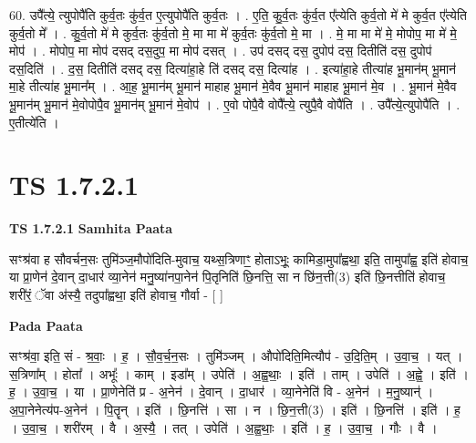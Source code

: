 \documentclass[17pt]{extarticle}
\begin{document}
60. उपै᳚त्ये॒ त्युपोपै॑ति कुर्व॒तः कु॑र्व॒त ए॒त्युपोपै॑ति कुर्व॒तः । . ए॒ति॒ कु॒र्व॒तः कु॑र्व॒त ए᳚त्येति कुर्व॒तो मे॑ मे कुर्व॒त ए᳚त्येति कुर्व॒तो मे᳚ । . कु॒र्व॒तो मे॑ मे कुर्व॒तः कु॑र्व॒तो मे॒ मा मा मे॑ कुर्व॒तः कु॑र्व॒तो मे॒ मा । . मे॒ मा मा मे॑ मे॒ मोपोप॒ मा मे॑ मे॒ मोप॑ । . मोपोप॒ मा मोप॑ दसद् दस॒दुप॒ मा मोप॑ दसत् । . उप॑ दसद् दस॒ दुपोप॑ दस॒ दितीति॑ दस॒ दुपोप॑ दस॒दिति॑ । . द॒स॒ दितीति॑ दसद् दस॒ दित्या॑हा॒हे ति॑ दसद् दस॒ दित्या॑ह । . इत्या॑हा॒हे तीत्या॑ह भू॒मान॑म् भू॒मान॑ मा॒हे तीत्या॑ह भू॒मान᳚म् । . आ॒ह॒ भू॒मान॑म् भू॒मान॑ माहाह भू॒मान॑ मे॒वैव भू॒मान॑ माहाह भू॒मान॑ मे॒व । . भू॒मान॑ मे॒वैव भू॒मान॑म् भू॒मान॑ मे॒वोपोपै॒व भू॒मान॑म् भू॒मान॑ मे॒वोप॑ । . ए॒वो पोपै॒वै वोपै᳚त्ये॒ त्युपै॒वै वोपै॑ति । . उपै᳚त्ये॒त्युपोपै॑ति । . ए॒तीत्ये॑ति । \newline
\pagebreak
{}

\section{ TS 1.7.2.1 }

\textbf{TS 1.7.2.1 } \newline
\textbf{Samhita Paata} \newline

सꣳश्र॑वा ह सौवर्चन॒सः तुमि॑ञ्ज॒मौपो॑दिति-मुवाच॒ यथ्स॒त्रिणाꣳ॒॒ होताऽभूः॒ कामिडा॒मुपा᳚ह्वथा॒ इति॒ तामुपा᳚ह्व॒ इति॑ होवाच॒ या प्रा॒णेन॑ दे॒वान् दा॒धार॑ व्या॒नेन॑ मनु॒ष्या॑नपा॒नेन॑ पि॒तृनिति॑ छि॒नत्ति॒ सा न छि॑न॒त्ती(3) इति॑ छि॒नत्तीति॑ होवाच॒ शरी॑रं॒ ॅवा अ॑स्यै॒ तदुपा᳚ह्वथा॒ इति॑ होवाच॒ गौर्वा - [ ] \newline

\textbf{Pada Paata} \newline

सꣳश्र॑वा॒ इति॒ सं - श्र॒वाः॒ । ह॒ । सौ॒व॒र्च॒न॒सः । तुमि॑ञ्जम् । औपो॑दिति॒मित्यौप॑ - उ॒दि॒ति॒म् । उ॒वा॒च॒ । यत् । स॒त्रिणा᳚म् । होता᳚ । अभूः᳚ । काम् । इडा᳚म् । उपेति॑ । अ॒ह्व॒थाः॒ । इति॑ । ताम् । उपेति॑ । अ॒ह्वे॒ । इति॑ । ह॒ । उ॒वा॒च॒ । या । प्रा॒णेनेति॑ प्र - अ॒नेन॑ । दे॒वान् । दा॒धार॑ । व्या॒नेनेति॑ वि - अ॒नेन॑ । म॒नु॒ष्यान्॑ । अ॒पा॒नेनेत्य॑प-अ॒नेन॑ । पि॒तॄन् । इति॑ । छि॒नत्ति॑ । सा । न । छि॒न॒त्ती(3) । इति॑ । छि॒नत्ति॑ । इति॑ । ह॒ । उ॒वा॒च॒ । शरी॑रम् । वै । अ॒स्यै॒ । तत् । उपेति॑ । अ॒ह्व॒थाः॒ । इति॑ । ह॒ । उ॒वा॒च॒ । गौः । वै ।  \newline
\end{document}
